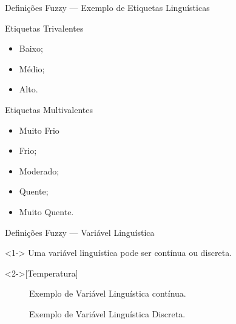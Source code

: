 \documentclass[portuges]{beamer}
\begin{document}
\begin{frame}{Definições Fuzzy --- Exemplo de Etiquetas Linguísticas}
	\begin{exampleblock}{Etiquetas Trivalentes}
		\begin{itemize}
			\item Baixo;
			\item Médio;
			\item Alto.
		\end{itemize}	
	\end{exampleblock}
	
	\begin{exampleblock}{Etiquetas Multivalentes}
		\begin{itemize}
			\item Muito Frio
			\item Frio;
			\item Moderado;
			\item Quente;
			\item Muito Quente.
		\end{itemize}	
	\end{exampleblock}
\end{frame}

\begin{frame}{Definições Fuzzy --- Variável Linguística}
	\begin{definition}<1->
		Uma variável linguística pode ser contínua ou discreta.
		\end{definition}
	\begin{example}<2->[Temperatura]	
	\begin{figure}
			\centering
			\caption{Exemplo de Variável Linguística contínua.}
	\end{figure}
	\end{example}
\end{frame}

\begin{frame}
	\begin{example}
	\begin{figure}
			\centering
			\caption{Exemplo de Variável Linguística Discreta.}
	\end{figure}	
	\end{example}
\end{frame}
\end{document}
